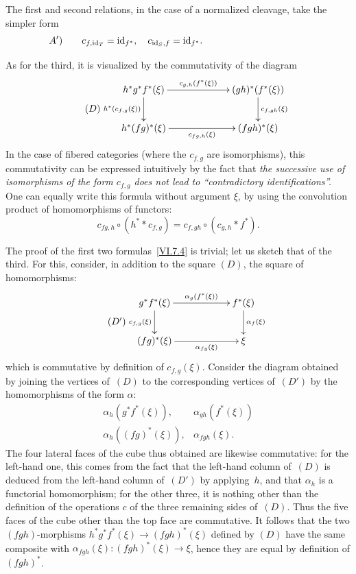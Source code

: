 The first and second relations, in the case of a normalized
cleavage, take the simpler form
\begin{equation*}
\label{eq:VI.7.A'}\quad A')\qquad {c_{f,\mathrm{id}_T}=\mathrm{id}_{f^*},\quad
c_{\mathrm{id}_S,f}=\mathrm{id}_{f^*}.\qquad\qquad\qquad\qquad\qquad\qquad}
\end{equation*}

As for the third, it is visualized by the
commutativity of the diagram
\begin{equation*}
\tag{$D$}
\label{eq:VI.7.D}
\begin{split}
\xymatrix@C=2.2cm{
h^*g^*f^*(\xi) \ar[r]^-{c_{g,h}(f^*(\xi))} \ar[d]_{h^*(c_{f,g}(\xi))}
& (gh)^*(f^*(\xi)) \ar[d]^{c_{f,gh}(\xi)} \\
h^*(fg)^*(\xi) \ar[r]_-{c_{fg,h}(\xi)} & (fgh)^*(\xi) }
\end{split}
\end{equation*}
In the case of fibered
categories
(where the $c_{f,g}$ are isomorphisms), this commutativity
can be expressed intuitively by the fact that \emph{the successive
use of isomorphisms of the form $c_{f,g}$ does not lead
to ``contradictory identifications''.} One can equally
write this formula without argument $\xi$, by using the
convolution product of homomorphisms of functors:
$$
c_{fg,h}\circ (h^**c_{f,g})=c_{f,gh}\circ(c_{g,h}*f^*).
$$

The proof of the first two formulas~\ref{VI.7.4} is
trivial; let us sketch that of the third. For this,
consider, in addition to the square $(D)$, the square
of homomorphisms:
\begin{equation*}
\tag{$D'$}
\label{eq:VI.7.D'}
\begin{split}
\xymatrix@C=2cm{
g^*f^*(\xi) \ar[r]^-{\alpha_g(f^*(\xi))}
\ar[d]_{c_{f,g}(\xi)} & f^*(\xi) \ar[d]^{\alpha_f(\xi)} \\
(fg)^*(\xi) \ar[r]_-{\alpha_{fg}(\xi)} & \xi }
\end{split}
\end{equation*}
which
is commutative by definition of
$c_{f,g}(\xi)$. Consider the diagram obtained by joining the
vertices of~$(D)$ to the corresponding vertices of~$(D')$ by the
homomorphisms of the form $\alpha$:
$$
\begin{array}{ll}
\alpha_h(g^*f^*(\xi)),&\alpha_{gh}(f^*(\xi))\\
\alpha_h((fg)^*(\xi)),&\alpha_{fgh}(\xi).
\end{array}
$$
The four lateral faces of the cube thus obtained are likewise
commutative: for the left-hand one, this comes from the fact that the
left-hand column of~$(D)$ is deduced from the left-hand column of~$(D')$
by applying~$h$, and that $\alpha_h$ is a functorial
homomorphism; for the other three, it is nothing other than the
definition of the operations $c$ of the three remaining sides
of~$(D)$. Thus the five faces of the cube other than the
top face are commutative. It follows that the two
$(fgh)$-morphisms $h^*g^*f^*(\xi)\to(fgh)^*(\xi)$ defined by
$(D)$ have the same composite with $\alpha_{fgh}(\xi)\colon
(fgh)^*(\xi)\to\xi$, hence they are equal by definition of
$(fgh)^*$.

